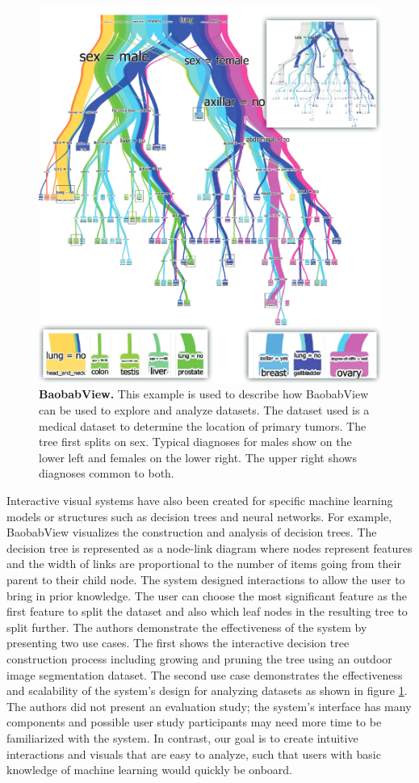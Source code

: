 \begin{figure}[h]
\centering
\includegraphics[width=1\textwidth]{baoview}
\caption{\textbf{BaobabView.} This example is used to describe how BaobabView can be used to explore and analyze datasets. The dataset used is a medical dataset to determine the location of primary tumors. The tree first splits on sex. Typical diagnoses for males show on the lower left and females on the lower right. The upper right shows diagnoses common to both.}\label{fig:baoview}
\end{figure}

Interactive visual systems have also been created for specific machine learning models or structures such as decision trees and neural networks. For example, BaobabView \cite{BaobabView} visualizes the construction and analysis of decision trees. The decision tree is represented as a node-link diagram where nodes represent features and the width of links are proportional to the number of items going from their parent to their child node. The system designed interactions to allow the user to bring in prior knowledge. The user can choose the most significant feature as the first feature to split the dataset and also which leaf nodes in the resulting tree to split further. The authors demonstrate the effectiveness of the system by presenting two use cases. The first shows the interactive decision tree construction process including growing and pruning the tree using an outdoor image segmentation dataset. The second use case demonstrates the effectiveness and scalability of the system's design for analyzing datasets as shown in figure \ref{fig:baoview}. The authors did not present an evaluation study; the system's interface has many components and possible user study participants may need more time to be familiarized with the system. In contrast, our goal is to create intuitive interactions and visuals that are easy to analyze, such that users with basic knowledge of machine learning would quickly be onboard.

